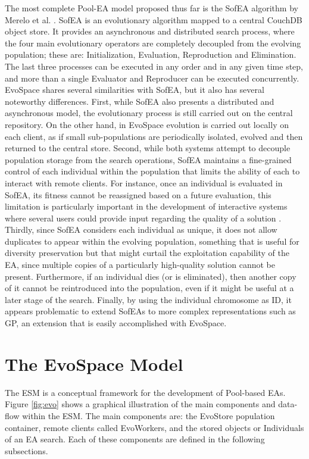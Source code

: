 The most complete Pool-EA model proposed thus far is the SofEA algorithm by Merelo et al. \cite{sofea1,sofea2,sofea3}.
SofEA is an evolutionary algorithm mapped to a central CouchDB object store. It provides an asynchronous and distributed search process,
where the four main evolutionary operators are completely decoupled from the evolving population; these are: Initialization, Evaluation, Reproduction and Elimination.
The last three processes can be executed in any order and in any given time step, and more than a single Evaluator and Reproducer can be
executed concurrently.
EvoSpace shares several similarities with SofEA, but it also has several noteworthy differences.
First, while SofEA also presents a distributed and asynchronous model, the evolutionary process is still carried out on the central repository.
On the other hand, in EvoSpace evolution is carried out locally on each client, as if small sub-populations are periodically isolated, evolved and then returned to the central store.
Second, while both systems attempt to decouple population storage from the search operations, SofEA maintains a fine-grained control of each individual
within the population that limits the ability of each to interact with remote clients.
For instance, once an individual is evaluated in SofEA, its fitness cannot be reassigned based on a future evaluation,
this limitation is particularly important in the development of interactive systems where several users could provide input regarding the quality of a solution \cite{Musart}.
Thirdly, since SofEA considers each individual as unique, it does not allow duplicates to appear within the evolving population, something that is useful for diversity preservation but that might curtail the exploitation capability of the EA, since multiple copies of a particularly high-quality solution cannot be present.
Furthermore, if an individual dies (or is eliminated), then another copy of it cannot be reintroduced into the population,
even if it might be useful at a later stage of the search.
Finally, by using the individual chromosome as ID, it appears problematic to extend SofEAs to more complex representations such as GP,
an extension that is easily accomplished with EvoSpace.

\section{The EvoSpace Model} %
\label{sec:evospace}
The ESM is a conceptual framework for the development of Pool-based EAs. Figure \ref{fig:evo} shows a graphical illustration of the main components and data-flow within the ESM. The main components are: the EvoStore population container, remote clients called EvoWorkers, and the stored objects or Individuals of an EA search.
Each of these components are defined in the following subsections.

